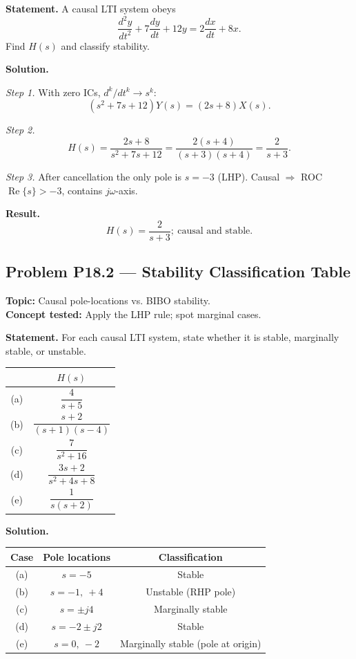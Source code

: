 \documentclass[11pt]{article}
\newcommand{\Real}{\operatorname{Re}}
\begin{document}
\textbf{Statement.} A causal LTI system obeys
\[
\frac{d^{2}y}{dt^{2}}+7\frac{dy}{dt}+12y = 2\frac{dx}{dt}+8x.
\]
Find $H(s)$ and classify stability.

\textbf{Solution.}

\textit{Step 1.} With zero ICs, $d^{k}/dt^{k}\to s^{k}$:
\[
(s^{2}+7s+12)Y(s) = (2s+8)X(s).
\]

\textit{Step 2.}
\[
H(s) = \frac{2s+8}{s^{2}+7s+12} = \frac{2(s+4)}{(s+3)(s+4)} = \frac{2}{s+3}.
\]

\textit{Step 3.} After cancellation the only pole is $s=-3$ (LHP).
Causal $\Rightarrow$ ROC $\Real\{s\}>-3$, contains $j\omega$-axis.

\textbf{Result.}
\[
\boxed{\,H(s) = \frac{2}{s+3};\ \text{causal and stable.}\,}
\]

\subsection{Problem P18.2 --- Stability Classification Table}
\textbf{Topic:} Causal pole-locations vs. BIBO stability.\\
\textbf{Concept tested:} Apply the LHP rule; spot marginal cases.

\textbf{Statement.} For each causal LTI system, state whether it is stable, marginally stable, or unstable.

\begin{center}
\begin{tabular}{c|c}
 & $H(s)$ \\\hline
(a) & $\dfrac{4}{s+5}$ \\[4pt]
(b) & $\dfrac{s+2}{(s+1)(s-4)}$ \\[4pt]
(c) & $\dfrac{7}{s^{2}+16}$ \\[4pt]
(d) & $\dfrac{3s+2}{s^{2}+4s+8}$ \\[4pt]
(e) & $\dfrac{1}{s(s+2)}$ \\
\end{tabular}
\end{center}

\textbf{Solution.}

\begin{center}
\begin{tabular}{c|c|c}
Case & Pole locations & Classification\\\hline
(a) & $s=-5$ & Stable\\
(b) & $s=-1,\ +4$ & Unstable (RHP pole)\\
(c) & $s=\pm j4$ & Marginally stable\\
(d) & $s=-2\pm j2$ & Stable\\
(e) & $s=0,\ -2$ & Marginally stable (pole at origin)\\
\end{tabular}
\end{center}
\end{document}
